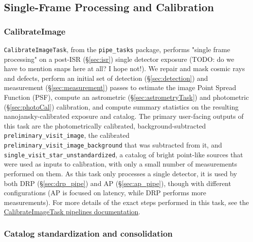 \subsection{Single-Frame Processing and Calibration}

\subsubsection{CalibrateImage}
\label{sec:CalibrateImage}

\texttt{CalibrateImageTask}, from the \texttt{pipe\_tasks} package, performs "single frame processing" on a post-ISR (\S\ref{sec:isr}) single detector exposure (TODO: do we have to mention snaps here at all? I hope not!).
We repair and mask cosmic rays and defects, perform an initial set of detection (\S\ref{sec:detection}) and measurement (\S\ref{sec:measurement}) passes to estimate the image Point Spread Function (PSF), compute an astrometric (\S\ref{sec:astrometryTask}) and photometric (\S\ref{sec:photoCal}) calibration, and compute summary statistics on the resulting nanojansky-calibrated exposure and catalog.
The primary user-facing outputs of this task are the photometrically calibrated, background-subtracted \texttt{preliminary\_visit\_image}, the calibrated \texttt{preliminary\_visit\_image\_background} that was subtracted from it, and \texttt{single\_visit\_star\_unstandardized}, a catalog of bright point-like sources that were used as inputs to calibration, with only a small number of measurements performed on them.
As this task only processes a single detector, it is used by both DRP (\S\ref{sec:drp_pipe}) and AP (\S\ref{sec:ap_pipe}), though with different configurations (AP is focused on latency, while DRP performs more measurements).
For more details of the exact steps performed in this task, see the \href{https://pipelines.lsst.io/v/daily/modules/lsst.pipe.tasks/tasks/lsst.pipe.tasks.calibrateImage.CalibrateImageTask.html}{CalibrateImageTask pipelines documentation}.

\subsubsection{Catalog standardization and consolidation}
\label{sec:StandardizeAndConsolidate}

